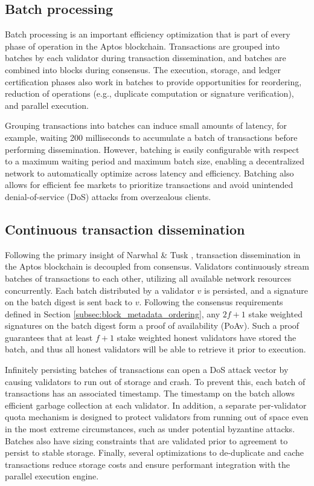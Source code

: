 \documentclass{article}
\begin{document}
\subsection{Batch processing}

Batch processing is an important efficiency optimization that is part of every phase of operation in the Aptos blockchain. Transactions are grouped into batches by each validator during transaction dissemination, and batches are combined into blocks during consensus. The execution, storage, and ledger certification phases also work in batches to provide opportunities for reordering, reduction of operations (e.g., duplicate computation or signature verification), and parallel execution.

Grouping transactions into batches can induce small amounts of latency, for example, waiting 200 milliseconds to accumulate a batch of transactions before performing dissemination. However, batching is easily configurable with respect to a maximum waiting period and maximum batch size, enabling a decentralized network to automatically optimize across latency and efficiency. Batching also allows for efficient fee markets to prioritize transactions and avoid unintended denial-of-service (DoS) attacks from overzealous clients.

\subsection{Continuous transaction dissemination}
\label{continuous_txn_dissemination}

Following the primary insight of Narwhal \& Tusk \cite{narwhal_tusk}, transaction dissemination in the Aptos blockchain is decoupled from consensus. Validators continuously stream batches of transactions to each other, utilizing all available network resources concurrently. Each batch distributed by a validator $v$ is persisted, and a signature on the batch digest is sent back to $v$. Following the consensus requirements defined in Section \ref{subsec:block_metadata_ordering}, any $2f+1$ stake weighted signatures on the batch digest form a proof of availability (PoAv). Such a proof guarantees that at least $f+1$ stake weighted honest validators have stored the batch, and thus all honest validators will be able to retrieve it prior to execution. 

Infinitely persisting batches of transactions can open a DoS attack vector by causing validators to run out of storage and crash. To prevent this, each batch of transactions has an associated timestamp. The timestamp on the batch allows efficient garbage collection at each validator. In addition, a separate per-validator quota mechanism is designed to protect validators from running out of space even in the most extreme circumstances, such as under potential byzantine attacks. Batches also have sizing constraints that are validated prior to agreement to persist to stable storage. Finally, several optimizations to de-duplicate and cache transactions reduce storage costs and ensure performant integration with the parallel execution engine.
\end{document}
